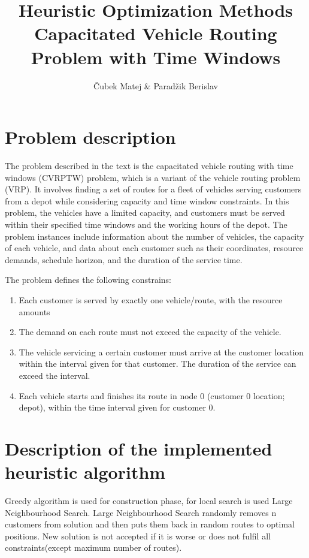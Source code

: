 \documentclass{article}
\title{Heuristic Optimization Methods
\\ Capacitated Vehicle Routing Problem with Time Windows}
\author{Čubek Matej & Paradžik Berislav}
\begin{document}
\maketitle

\clearpage

\tableofcontents

\clearpage

\section{Problem description}
The problem described in the text is the capacitated vehicle routing with time windows (CVRPTW) problem, which is a variant of the vehicle routing problem (VRP). It involves finding a set of routes for a fleet of vehicles serving customers from a depot while considering capacity and time window constraints. In this problem, the vehicles have a limited capacity, and customers must be served within their specified time windows and the working hours of the depot. The problem instances include information about the number of vehicles, the capacity of each vehicle, and data about each customer such as their coordinates, resource demands, schedule horizon, and the duration of the service time.

The problem defines the following constrains:
\begin{enumerate}
  \item Each customer is served by exactly one vehicle/route, with the resource amounts
  \item The demand on each route must not exceed the capacity of the vehicle.
  \item The vehicle servicing a certain customer must arrive at the customer location
within the interval given for that customer. The duration of the service can
exceed the interval.
\item Each vehicle starts and finishes its route in node 0 (customer 0 location; depot),
within the time interval given for customer 0.
\end{enumerate}


\section{Description of the implemented heuristic algorithm}
Greedy algorithm is used for construction phase, for local search is used Large Neighbourhood Search. Large Neighbourhood Search randomly removes n customers from solution and then puts them back in random routes to optimal positions. New solution is not accepted if it is worse or does not fulfil all constraints(except maximum number of routes).
\end{document}
